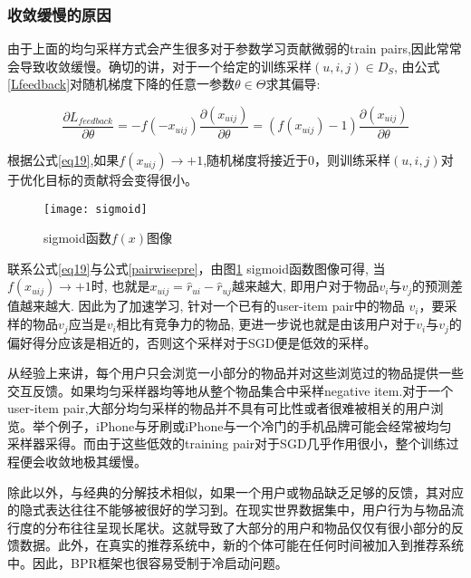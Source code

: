 \subsubsection{收敛缓慢的原因}
由于上面的均匀采样方式会产生很多对于参数学习贡献微弱的train pairs,因此常常会导致收敛缓慢。确切的讲，对于一个给定的训练采样$\left(u,i,j\right) \in D_S$, 由公式\ref{Lfeedback}对随机梯度下降的任意一参数$\theta \in \Theta$求其偏导:

\begin{equation}
\label{eq19}
\frac {\partial L_{feedback}} {\partial\theta} 
= -f\left(-x_{uij}\right)\frac{\partial\left(x_{uij}\right)}{\partial\theta}
= \left(f\left(x_{uij}\right)-1\right) \frac{\partial\left(x_{uij}\right)}{\partial\theta}
\end{equation}

根据公式\eqref{eq19},如果$f \left(x_{uij}\right) \rightarrow +1$,随机梯度将接近于0，则训练采样$\left(u,i,j\right)$对于优化目标的贡献将会变得很小。
\begin{figure}[htbp]
	\begin{center}
		\texttt{[image: sigmoid]}
		\caption{sigmoid函数$f \left(x\right) $图像}
		\label{gra-sigmoid}
	\end{center}
\end{figure}

联系公式\eqref{eq19}与公式\eqref{pairwisepre}，由图\ref{gra-sigmoid} sigmoid函数图像可得, 当$f \left(x_{uij}\right) \rightarrow +1$时, 也就是$x_{uij} = \hat{r}_{ui} - \hat{r}_{uj}$越来越大, 即用户对于物品$v_i$与$v_j$的预测差值越来越大. 因此为了加速学习, 针对一个已有的user-item pair中的物品 $v_i$，要采样的物品$v_j$应当是$v_i$相比有竞争力的物品, 更进一步说也就是由该用户对于$v_i$与$v_j$的偏好得分应该是相近的，否则这个采样对于SGD便是低效的采样。

从经验上来讲，每个用户只会浏览一小部分的物品并对这些浏览过的物品提供一些交互反馈。如果均匀采样器均等地从整个物品集合中采样negative  item.对于一个user-item  pair,大部分均匀采样的物品并不具有可比性或者很难被相关的用户浏览。举个例子，iPhone与牙刷或iPhone与一个冷门的手机品牌可能会经常被均匀采样器采得。而由于这些低效的training pair对于SGD几乎作用很小，整个训练过程便会收敛地极其缓慢。

除此以外，与经典的分解技术相似，如果一个用户或物品缺乏足够的反馈，其对应的隐式表达往往不能够被很好的学习到。在现实世界数据集中，用户行为与物品流行度的分布往往呈现长尾状。这就导致了大部分的用户和物品仅仅有很小部分的反馈数据。此外，在真实的推荐系统中，新的个体可能在任何时间被加入到推荐系统中。因此，BPR框架也很容易受制于冷启动问题。

